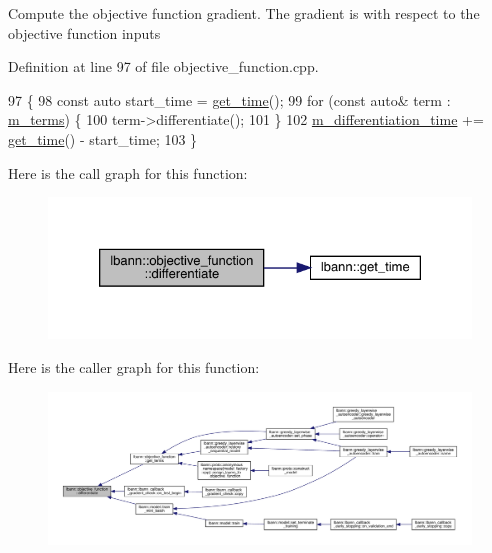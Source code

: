 Compute the objective function gradient. The gradient is with respect to the objective function inputs 

Definition at line 97 of file objective\+\_\+function.\+cpp.


\begin{DoxyCode}
97                                        \{
98   \textcolor{keyword}{const} \textcolor{keyword}{auto} start\_time = \hyperlink{namespacelbann_a478d36031ff0659893c4322cd856157f}{get\_time}();
99   \textcolor{keywordflow}{for} (\textcolor{keyword}{const} \textcolor{keyword}{auto}& term : \hyperlink{classlbann_1_1objective__function_aea9c1f90ba9af1b1330efa2ba6adb5e2}{m\_terms}) \{
100     term->differentiate();
101   \}
102   \hyperlink{classlbann_1_1objective__function_ae526559f3a530f540a29407ea64bbea6}{m\_differentiation\_time} += \hyperlink{namespacelbann_a478d36031ff0659893c4322cd856157f}{get\_time}() - start\_time;
103 \}
\end{DoxyCode}
Here is the call graph for this function\+:\nopagebreak
\begin{figure}[H]
\begin{center}
\leavevmode
\includegraphics[width=326pt]{classlbann_1_1objective__function_ae8b7314bdc12ba52d270b46a35acd138_cgraph}
\end{center}
\end{figure}
Here is the caller graph for this function\+:\nopagebreak
\begin{figure}[H]
\begin{center}
\leavevmode
\includegraphics[width=350pt]{classlbann_1_1objective__function_ae8b7314bdc12ba52d270b46a35acd138_icgraph}
\end{center}
\end{figure}
\mbox{\label{classlbann_1_1objective__function_ad35ce9b7daa87d197d00b1762b691a02}} 
